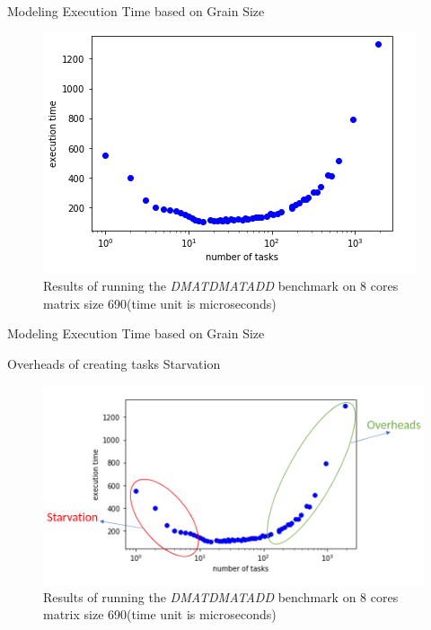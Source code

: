 \documentclass[10pt]{beamer}
\begin{document}
\begin{frame}{Modeling Execution Time based on Grain Size}
	\begin{outline}
		\begin{figure}
			\includegraphics[width=0.9\linewidth]{figures/true_1.png}	
			\caption{Results of running the \textit{DMATDMATADD} benchmark on 8 cores matrix size 690(time unit is microseconds)}	
		\end{figure}
	\end{outline}
\end{frame}

\begin{frame}{Modeling Execution Time based on Grain Size}
	\begin{outline}		
		\1Overheads of creating tasks
		\1Starvation
		\begin{figure}
			\includegraphics[width=0.9\linewidth]{figures/true_1_annotated.png}	
			\caption{Results of running the \textit{DMATDMATADD} benchmark on 8 cores matrix size 690(time unit is microseconds)}	
		\end{figure}
	\end{outline}
\end{frame}
\end{document}
